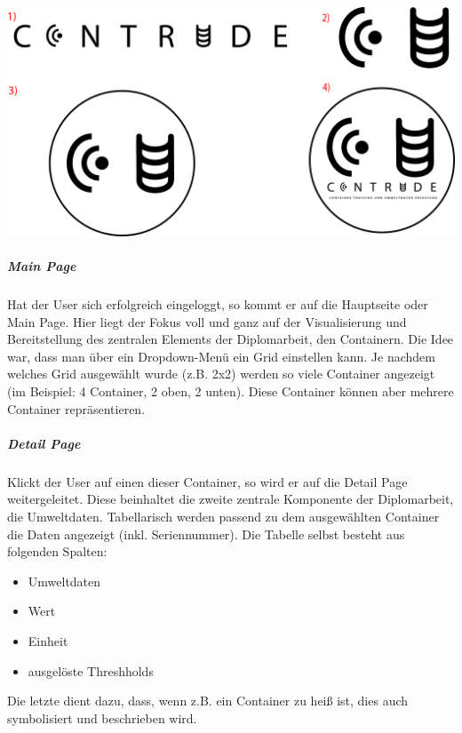 \documentclass[
    headings=optiontotocandhead,%
    twoside,
    numbers=noenddot,%
    12pt, %
    titlepage, %
    parskip=full, %
    listof=leveldown, 
    numbers=noenddot, %
    a4paper,DIV=14,
    BCOR=15mm,
]{scrbook}
\let\origfigure=\figure
\let\endorigfigure=\endfigure
\renewenvironment{figure}[1][]{%
   \origfigure[H]
}{%
   \endorigfigure
}
\providecommand{\tightlist}{%
  \setlength{\itemsep}{0pt}\setlength{\parskip}{0pt}}
\begin{document}
\begin{figure}
\centering
\includegraphics{img/Gekle/Contrude-All-Logos.png}
\caption{Alle Versionen des Logos; 1: Nur-Text 2: Symbole 3: Normal 4:
Voll umfassend}
\end{figure}

\hypertarget{main-page}{%
\subparagraph{Main Page}\label{main-page}}

Hat der User sich erfolgreich eingeloggt, so kommt er auf die Hauptseite
oder Main Page. Hier liegt der Fokus voll und ganz auf der
Visualisierung und Bereitstellung des zentralen Elements der
Diplomarbeit, den Containern. Die Idee war, dass man über ein
Dropdown-Menü ein Grid einstellen kann. Je nachdem welches Grid
ausgewählt wurde (z.B. 2x2) werden so viele Container angezeigt (im
Beispiel: 4 Container, 2 oben, 2 unten). Diese Container können aber
mehrere Container repräsentieren.

\hypertarget{detail-page}{%
\subparagraph{Detail Page}\label{detail-page}}

Klickt der User auf einen dieser Container, so wird er auf die Detail
Page weitergeleitet. Diese beinhaltet die zweite zentrale Komponente der
Diplomarbeit, die Umweltdaten. Tabellarisch werden passend zu dem
ausgewählten Container die Daten angezeigt (inkl. Seriennummer). Die
Tabelle selbst besteht aus folgenden Spalten:

\begin{itemize}
\tightlist
\item
  Umweltdaten
\item
  Wert
\item
  Einheit
\item
  ausgelöste Threshholds
\end{itemize}

Die letzte dient dazu, dass, wenn z.B. ein Container zu heiß ist, dies
auch symbolisiert und beschrieben wird.
\end{document}
